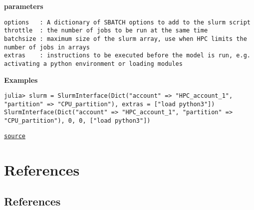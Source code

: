 \begin{adjustwidth}{2em}{0pt}
\textbf{parameters}


\begin{verbatim}
options   : A dictionary of SBATCH options to add to the slurm script
throttle  : the number of jobs to be run at the same time
batchsize : maximum size of the slurm array, use when HPC limits the number of jobs in arrays
extras    : instructions to be executed before the model is run, e.g. activating a python environment or loading modules
\end{verbatim}

\textbf{Examples}


\begin{verbatim}
julia> slurm = SlurmInterface(Dict("account" => "HPC_account_1", "partition" => "CPU_partition"), extras = ["load python3"])
SlurmInterface(Dict("account" => "HPC_account_1", "partition" => "CPU_partition"), 0, 0, ["load python3"])
\end{verbatim}



\href{https://github.com/friesischscott/UncertaintyQuantification.jl/blob/f5ee6cce729f0d6a57979257379c942cdf42f86f/src/hpc/slurm.jl#L1-L24}{\texttt{source}}


\end{adjustwidth}

\part{References}


\chapter{References}



\label{14148394603223710272}{}


